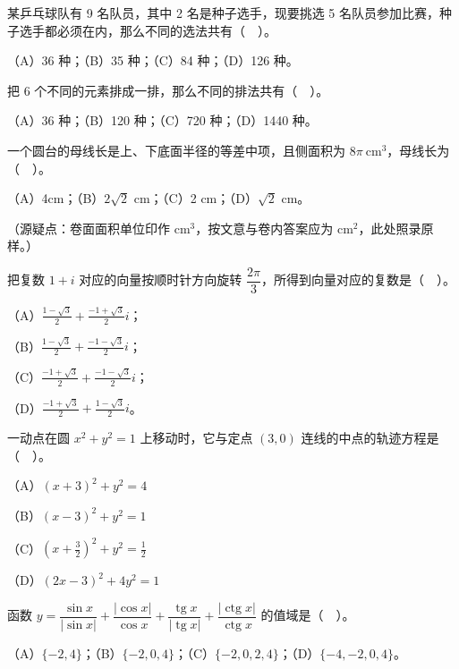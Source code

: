 \begin{question}
某乒乓球队有 9 名队员，其中 2 名是种子选手，现要挑选 5 名队员参加比赛，种子选手都必须在内，那么不同的选法共有（　）。

（A）36 种；（B）35 种；（C）84 种；（D）126 种。

\end{question}
\begin{question}
把 6 个不同的元素排成一排，那么不同的排法共有（　）。

（A）36 种；（B）120 种；（C）720 种；（D）1440 种。

\end{question}
\begin{question}
一个圆台的母线长是上、下底面半径的等差中项，且侧面积为 $8\pi\ \mathrm{cm}^3$，母线长为（　）。

（A）4cm；（B）$2\sqrt2$ cm；（C）2 cm；（D）$\sqrt2$ cm。

（源疑点：卷面面积单位印作 $\mathrm{cm}^3$，按文意与卷内答案应为 $\mathrm{cm}^2$，此处照录原样。）

\end{question}
\begin{question}
把复数 $1+i$ 对应的向量按顺时针方向旋转 $\dfrac{2\pi}{3}$，所得到向量对应的复数是（　）。

（A）$\frac{1-\sqrt3}{2}+\frac{-1+\sqrt3}{2}i$；

（B）$\frac{1-\sqrt3}{2}+\frac{-1-\sqrt3}{2}i$；

（C）$\frac{-1+\sqrt3}{2}+\frac{-1-\sqrt3}{2}i$；

（D）$\frac{-1+\sqrt3}{2}+\frac{1-\sqrt3}{2}i$。

\end{question}
\begin{question}
一动点在圆 $x^2+y^2=1$ 上移动时，它与定点 $(3,0)$ 连线的中点的轨迹方程是（　）。

（A）$(x+3)^2+y^2=4$

（B）$(x-3)^2+y^2=1$

（C）$\left(x+\frac32\right)^2+y^2=\frac12$

（D）$(2x-3)^2+4y^2=1$

\end{question}
\begin{question}
函数 $y=\dfrac{\sin x}{|\sin x|}+\dfrac{|\cos x|}{\cos x}+\dfrac{\operatorname{tg}x}{|\operatorname{tg}x|}+\dfrac{|\operatorname{ctg}x|}{\operatorname{ctg}x}$ 的值域是（　）。

（A）$\{-2,4\}$；（B）$\{-2,0,4\}$；（C）$\{-2,0,2,4\}$；（D）$\{-4,-2,0,4\}$。

\end{question}
